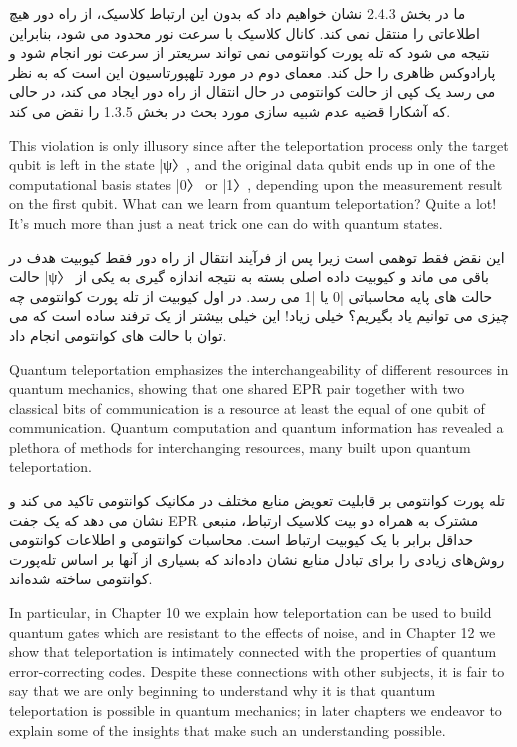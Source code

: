 \documentclass{book}
\begin{document}
ما در بخش 2.4.3 نشان خواهیم داد که بدون این ارتباط کلاسیک، از راه دور هیچ اطلاعاتی را منتقل نمی کند. کانال کلاسیک با سرعت نور محدود می شود، بنابراین نتیجه می شود که تله پورت کوانتومی نمی تواند سریعتر از سرعت نور انجام شود و پارادوکس ظاهری را حل کند. معمای دوم در مورد تلهپورتاسیون این است که به نظر می رسد یک کپی از حالت کوانتومی در حال انتقال از راه دور ایجاد می کند، در حالی که آشکارا قضیه عدم شبیه سازی مورد بحث در بخش 1.3.5 را نقض می کند.

 This violation is only illusory since after the teleportation process only the target qubit is left in the state |ψ〉, and the original data qubit ends up in one of the computational basis states |0〉 or |1〉, depending upon the measurement result on the first
qubit. What can we learn from quantum teleportation? Quite a lot! It’s much more than just a neat trick one can do with quantum states. 

این نقض فقط توهمی است زیرا پس از فرآیند انتقال از راه دور فقط کیوبیت هدف در حالت |ψ〉 باقی می ماند و کیوبیت داده اصلی بسته به نتیجه اندازه گیری به یکی از حالت های پایه محاسباتی |0 یا |1 می رسد. در اول
کیوبیت از تله پورت کوانتومی چه چیزی می توانیم یاد بگیریم؟ خیلی زیاد! این خیلی بیشتر از یک ترفند ساده است که می توان با حالت های کوانتومی انجام داد.




Quantum teleportation emphasizes the interchangeability of different resources in quantum mechanics, showing that one shared EPR pair together with two classical bits of communication is a resource at least the equal of one qubit of communication. Quantum computation and quantum information has revealed a plethora of methods for interchanging resources, many built upon quantum teleportation. 

تله پورت کوانتومی بر قابلیت تعویض منابع مختلف در مکانیک کوانتومی تاکید می کند و نشان می دهد که یک جفت EPR مشترک به همراه دو بیت کلاسیک ارتباط، منبعی حداقل برابر با یک کیوبیت ارتباط است. محاسبات کوانتومی و اطلاعات کوانتومی روش‌های زیادی را برای تبادل منابع نشان داده‌اند که بسیاری از آنها بر اساس تله‌پورت کوانتومی ساخته شده‌اند.


In particular, in Chapter 10 we explain how teleportation can be used to build quantum gates which are resistant to the effects of noise, and in Chapter 12 we show that teleportation is intimately connected with the properties of quantum error-correcting codes. Despite these connections with other subjects, it is fair to say that we are only beginning to understand why it is that quantum teleportation is possible in quantum mechanics; in later chapters we endeavor to explain some of the insights that make such an understanding possible.
\end{document}
